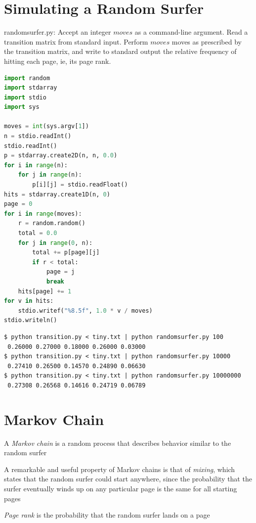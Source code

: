 \documentclass[8pt,a4paper,compress]{beamer}
\begin{document}
\section{Simulating a Random Surfer}
\begin{frame}[fragile]
\begin{framed}
\tiny randomsurfer.py: Accept an integer $moves$ as a command-line argument. Read a transition matrix from standard input. Perform $moves$ moves as prescribed by the transition matrix, and write to standard output the relative frequency of hitting each page, ie, its page rank.
\end{framed}

\begin{lstlisting}[language=Python]
import random
import stdarray
import stdio
import sys

moves = int(sys.argv[1])
n = stdio.readInt()
stdio.readInt()
p = stdarray.create2D(n, n, 0.0)
for i in range(n):
    for j in range(n):
        p[i][j] = stdio.readFloat()
hits = stdarray.create1D(n, 0)
page = 0
for i in range(moves):
    r = random.random()
    total = 0.0
    for j in range(0, n):
        total += p[page][j]
        if r < total:
            page = j
            break
    hits[page] += 1
for v in hits:
    stdio.writef("%8.5f", 1.0 * v / moves)
stdio.writeln()
\end{lstlisting}
\end{frame}

\begin{frame}[fragile]
\begin{lstlisting}[language={}]
$ python transition.py < tiny.txt | python randomsurfer.py 100
 0.26000 0.27000 0.18000 0.26000 0.03000
$ python transition.py < tiny.txt | python randomsurfer.py 10000
 0.27410 0.26500 0.14570 0.24890 0.06630
$ python transition.py < tiny.txt | python randomsurfer.py 10000000
 0.27308 0.26568 0.14616 0.24719 0.06789
\end{lstlisting}
\end{frame}

\section{Markov Chain}
\begin{frame}[fragile]
A \emph{Markov chain} is a random process that describes behavior similar to the random surfer

\bigskip

A remarkable and useful property of Markov chains is that of \emph{mixing}, which states that the random surfer could start anywhere, since the probability that the surfer eventually winds up on any particular page is the same for all starting pages

\bigskip

\emph{Page rank} is the probability that the random surfer lands on a page
\end{frame}
\end{document}
